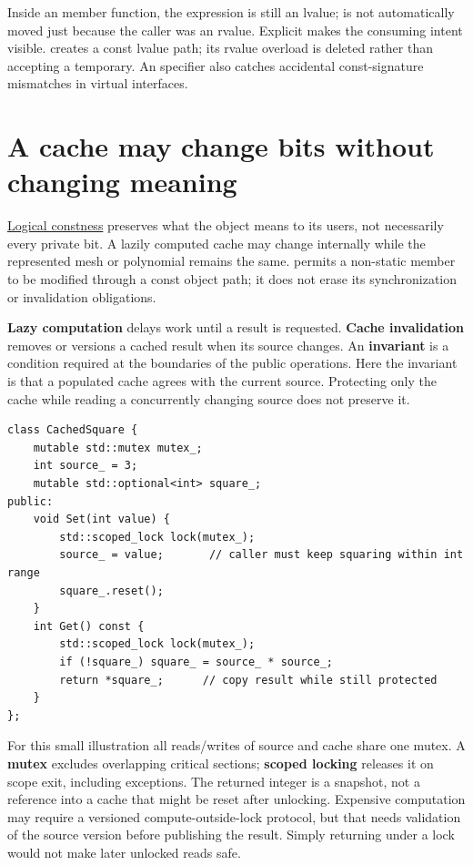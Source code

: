 Inside an \BookInlineCode{\&\&} member function, the expression  is still an lvalue;  is not automatically moved just because the caller was an rvalue. Explicit  makes the consuming intent visible.  creates a const lvalue path; its rvalue overload is deleted rather than accepting a temporary. An  specifier also catches accidental const-signature mismatches in virtual interfaces.

\section{A cache may change bits without changing meaning}\label{01-foundations-i-ch003-a-cache-may-change-bits-without-changing-meaning}

\hypertarget{01-foundations-i-ch003-a-cache-may-change-bits-without-changing-meaning}{}

\hyperref[appendix-f5593256bcaf]{Logical constness} preserves what the object means to its users, not necessarily every private bit. A lazily computed cache may change internally while the represented mesh or polynomial remains the same.  permits a non-static member to be modified through a const object path; it does not erase its synchronization or invalidation obligations.

\textbf{Lazy computation} delays work until a result is requested. \textbf{Cache invalidation} removes or versions a cached result when its source changes. An \textbf{invariant} is a condition required at the boundaries of the public operations. Here the invariant is that a populated cache agrees with the current source. Protecting only the cache while reading a concurrently changing source does not preserve it.

\begin{verbatim}
class CachedSquare {
    mutable std::mutex mutex_;
    int source_ = 3;
    mutable std::optional<int> square_;
public:
    void Set(int value) {
        std::scoped_lock lock(mutex_);
        source_ = value;       // caller must keep squaring within int range
        square_.reset();
    }
    int Get() const {
        std::scoped_lock lock(mutex_);
        if (!square_) square_ = source_ * source_;
        return *square_;      // copy result while still protected
    }
};
\end{verbatim}

For this small illustration all reads/writes of source and cache share one mutex. A \textbf{mutex} excludes overlapping critical sections; \textbf{scoped locking} releases it on scope exit, including exceptions. The returned integer is a snapshot, not a reference into a cache that might be reset after unlocking. Expensive computation may require a versioned compute-outside-lock protocol, but that needs validation of the source version before publishing the result. Simply returning  under a lock would not make later unlocked reads safe.

